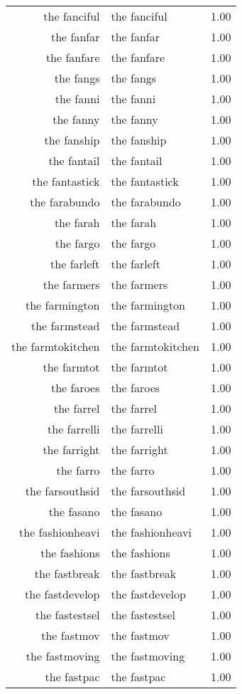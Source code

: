 \begin{table}[ht]
\begin{tabular}{rlr}
  the fanciful & the fanciful & 1.00 \\ 
  the fanfar & the fanfar & 1.00 \\ 
  the fanfare & the fanfare & 1.00 \\ 
  the fangs & the fangs & 1.00 \\ 
  the fanni & the fanni & 1.00 \\ 
  the fanny & the fanny & 1.00 \\ 
  the fanship & the fanship & 1.00 \\ 
  the fantail & the fantail & 1.00 \\ 
  the fantastick & the fantastick & 1.00 \\ 
  the farabundo & the farabundo & 1.00 \\ 
  the farah & the farah & 1.00 \\ 
  the fargo & the fargo & 1.00 \\ 
  the farleft & the farleft & 1.00 \\ 
  the farmers & the farmers & 1.00 \\ 
  the farmington & the farmington & 1.00 \\ 
  the farmstead & the farmstead & 1.00 \\ 
  the farmtokitchen & the farmtokitchen & 1.00 \\ 
  the farmtot & the farmtot & 1.00 \\ 
  the faroes & the faroes & 1.00 \\ 
  the farrel & the farrel & 1.00 \\ 
  the farrelli & the farrelli & 1.00 \\ 
  the farright & the farright & 1.00 \\ 
  the farro & the farro & 1.00 \\ 
  the farsouthsid & the farsouthsid & 1.00 \\ 
  the fasano & the fasano & 1.00 \\ 
  the fashionheavi & the fashionheavi & 1.00 \\ 
  the fashions & the fashions & 1.00 \\ 
  the fastbreak & the fastbreak & 1.00 \\ 
  the fastdevelop & the fastdevelop & 1.00 \\ 
  the fastestsel & the fastestsel & 1.00 \\ 
  the fastmov & the fastmov & 1.00 \\ 
  the fastmoving & the fastmoving & 1.00 \\ 
  the fastpac & the fastpac & 1.00 \\ 

\end{tabular}
\end{table}
